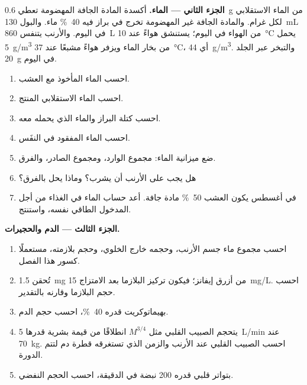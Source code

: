 \begin{problem}
\medskip
\noindent\textbf{الجزء الثاني --- الماء.}
أكسدة المادة الجافة المهضومة تعطي \qty{0.6}{g} من الماء الاستقلابي
لكل غرام. والمادة الجافة غير المهضومة تخرج في براز فيه \qty{40}{\%}
ماء. والبول \qty{130}{mL} في اليوم. والأرنب يتنفس \qty{860}{L} من
الهواء في اليوم؛ يستنشق هواءً عند \qty{10}{\celsius} يحمل
\qty{5}{g/m^3} من بخار الماء ويزفر هواءً مشبعًا عند
\qty{37}{\celsius}، أي \qty{44}{g/m^3}. والتبخر عبر الجلد
\qty{20}{g} في اليوم.
\begin{enumerate}[resume]
  \item احسب الماء المأخوذ مع العشب.
  \item احسب الماء الاستقلابي المنتج.
  \item احسب كتلة البراز والماء الذي يحمله معه.
  \item احسب الماء المفقود في النفَس.
  \item ضع ميزانية الماء: مجموع الوارد، ومجموع الصادر، والفرق.
  \item هل يجب على الأرنب أن يشرب؟ وماذا يحل بالفرق؟
  \item في أغسطس يكون العشب \qty{50}{\%} مادة جافة. أعد حساب الماء
        في الغذاء من أجل المدخول الطاقي نفسه، واستنتج.
\end{enumerate}

\medskip
\noindent\textbf{الجزء الثالث --- الدم والحجيرات.}
\begin{enumerate}[resume]
  \item احسب مجموع ماء جسم الأرنب، وحجمه خارج الخلوي، وحجم بلازمته،
        مستعملًا كسور هذا الفصل.
  \item تُحقن \qty{1.5}{mg} من أزرق إيفانز؛ فيكون تركيز البلازما بعد
        الامتزاج \qty{15}{mg/L}. احسب حجم البلازما وقارنه بالتقدير.
  \item بهيماتوكريت قدره \qty{40}{\%}، احسب حجم الدم.
  \item يتحجم الصبيب القلبي مثل $M^{3/4}$ انطلاقًا من قيمة بشرية
        قدرها \qty{5}{L/min} عند \qty{70}{kg}. احسب الصبيب القلبي
        عند الأرنب والزمن الذي تستغرقه قطرة دم لتتم الدورة.
  \item بتواتر قلبي قدره \qty{200}{} نبضة في الدقيقة، احسب الحجم
        النفضي.
\end{enumerate}


\end{problem}
